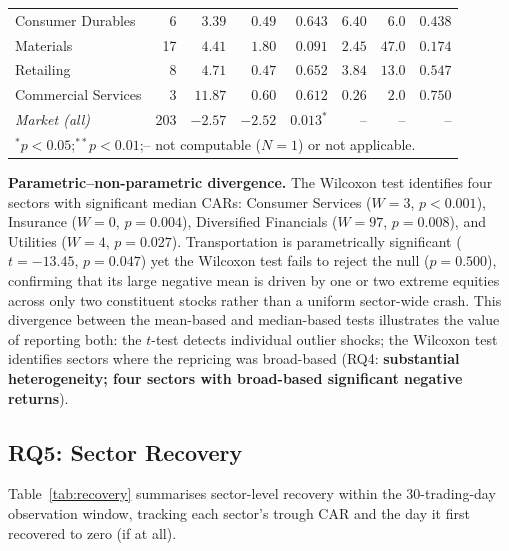 \documentclass[sigconf, nonacm]{acmart}
\begin{document}
\begin{table}[!htb]
\begin{tabular}{@{}lrrrrrrr@{}}
    Consumer Durables & 6 & $ 3.39$ & $ 0.49$ & $0.643$ & $ 6.40$ & $6.0$ & $0.438$ \\
    Materials & 17 & $ 4.41$ & $ 1.80$ & $0.091$ & $ 2.45$ & $47.0$ & $0.174$ \\
    Retailing & 8 & $ 4.71$ & $ 0.47$ & $0.652$ & $ 3.84$ & $13.0$ & $0.547$ \\
    Commercial Services & 3 & $ 11.87$ & $ 0.60$ & $0.612$ & $ 0.26$ & $2.0$ & $0.750$ \\
    \midrule
    \textit{Market (all)} & 203 & $-2.57$ & $-2.52$ & $0.013^{*}$ & -- & -- & -- \\
    \bottomrule
    \multicolumn{8}{l}{$^{*}p<0.05$;\quad $^{**}p<0.01$;\quad -- not computable ($N=1$) or not applicable.}
  \end{tabular}
\end{table}

\textbf{Parametric--non-parametric divergence.}
The Wilcoxon test identifies four sectors with significant median CARs: Consumer Services ($W=3$, $p<0.001$), Insurance ($W=0$, $p=0.004$), Diversified Financials ($W=97$, $p=0.008$), and Utilities ($W=4$, $p=0.027$). Transportation
is parametrically significant ($t=-13.45$, $p=0.047$) yet the Wilcoxon
test fails to reject the null ($p=0.500$), confirming that its large
negative mean is driven by one or two extreme equities across only two
constituent stocks rather than a uniform sector-wide crash. This divergence
between the mean-based and median-based tests illustrates the value of
reporting both: the $t$-test detects individual outlier shocks; the
Wilcoxon test identifies sectors where the repricing was broad-based
(RQ4: \textbf{substantial heterogeneity; four sectors with broad-based
significant negative returns}).

\subsection{RQ5: Sector Recovery}

Table~\ref{tab:recovery} summarises sector-level recovery within the
30-trading-day observation window, tracking each sector's trough CAR and
the day it first recovered to zero (if at all).
\end{document}
